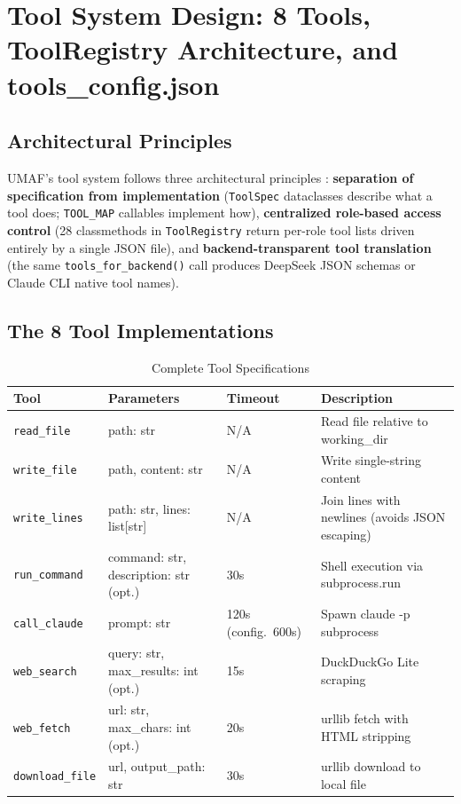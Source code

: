 \section{Tool System Design: 8 Tools, ToolRegistry Architecture, and tools\_config.json}
\label{sec:tools}

\subsection{Architectural Principles}

UMAF's tool system follows three architectural principles \cite{agenticfws,mcp}: \textbf{separation of specification from implementation} (\texttt{ToolSpec} dataclasses describe what a tool does; \texttt{TOOL\_MAP} callables implement how), \textbf{centralized role-based access control} (28 classmethods in \texttt{ToolRegistry} return per-role tool lists driven entirely by a single JSON file), and \textbf{backend-transparent tool translation} (the same \texttt{tools\_for\_backend()} call produces DeepSeek JSON schemas or Claude CLI native tool names).

\subsection{The 8 Tool Implementations}

\begin{table}[H]
\centering
\caption{Complete Tool Specifications}
\label{tab:tools}
\small
\begin{tabular}{@{}p{2.4cm}p{4.2cm}p{2cm}p{5cm}@{}}
\toprule
\textbf{Tool} & \textbf{Parameters} & \textbf{Timeout} & \textbf{Description} \\
\midrule
\texttt{read\_file} & path: str & N/A & Read file relative to working\_dir \\
\texttt{write\_file} & path, content: str & N/A & Write single-string content \\
\texttt{write\_lines} & path: str, lines: list[str] & N/A & Join lines with newlines (avoids JSON escaping) \\
\texttt{run\_command} & command: str, description: str (opt.) & 30s & Shell execution via subprocess.run \\
\texttt{call\_claude} & prompt: str & 120s (config.\ 600s) & Spawn claude -p subprocess \\
\texttt{web\_search} & query: str, max\_results: int (opt.) & 15s & DuckDuckGo Lite scraping \\
\texttt{web\_fetch} & url: str, max\_chars: int (opt.) & 20s & urllib fetch with HTML stripping \\
\texttt{download\_file} & url, output\_path: str & 30s & urllib download to local file \\
\bottomrule
\end{tabular}
\end{table}

